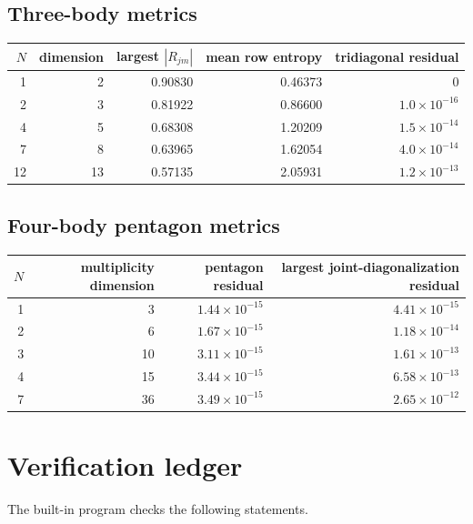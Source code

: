 \documentclass[11pt,openany]{report}
\theoremstyle{definition}
\theoremstyle{remark}
\begin{document}
\section{Three-body metrics}
\begin{center}
\small
\begin{tabular}{rrrrr}
\toprule
$N$ & dimension & largest $|R_{jm}|$ & mean row entropy & tridiagonal residual\\
\midrule
1&2&0.90830&0.46373&0\\
2&3&0.81922&0.86600&$1.0\times10^{-16}$\\
4&5&0.68308&1.20209&$1.5\times10^{-14}$\\
7&8&0.63965&1.62054&$4.0\times10^{-14}$\\
12&13&0.57135&2.05931&$1.2\times10^{-13}$\\
\bottomrule
\end{tabular}
\end{center}

\section{Four-body pentagon metrics}
\begin{center}
\small
\begin{tabular}{rrrr}
\toprule
$N$ & multiplicity dimension & pentagon residual & largest joint-diagonalization residual\\
\midrule
1&3&$1.44\times10^{-15}$&$4.41\times10^{-15}$\\
2&6&$1.67\times10^{-15}$&$1.18\times10^{-14}$\\
3&10&$3.11\times10^{-15}$&$1.61\times10^{-13}$\\
4&15&$3.44\times10^{-15}$&$6.58\times10^{-13}$\\
7&36&$3.49\times10^{-15}$&$2.65\times10^{-12}$\\
\bottomrule
\end{tabular}
\end{center}

\chapter{Verification ledger}

The built-in program checks the following statements.
\end{document}

